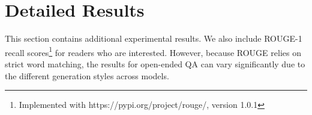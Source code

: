 \section{Detailed Results}
\label{sec:app_results}

This section contains additional experimental results. We also include ROUGE-1 recall scores\footnote{Implemented with https://pypi.org/project/rouge/, version 1.0.1} for readers who are interested. However, because ROUGE relies on strict word matching, the results for open-ended QA can vary significantly due to the different generation styles across models.

\begin{table}[h]
    \centering
    \caption{Impact from using highly irrelevant distractor in 1-in-k setting. ``Same'' denotes hard-negatives from same species, ``Irrel'' denotes irrelevant images from other species.} %
    \label{tab:diff_distractor}
\end{table}

